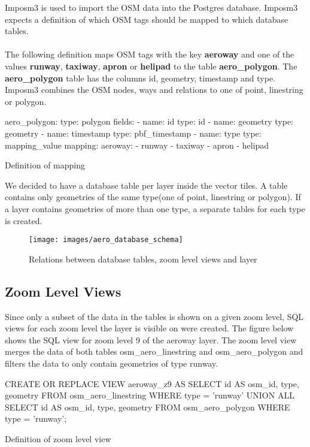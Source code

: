 Imposm3 is used to import the OSM data into the Postgres database. Imposm3 expects a definition of which OSM tags should be mapped to which database tables. \\\\
The following definition maps OSM tags with the key \textbf{aeroway} and one of the values \textbf{runway}, \textbf{taxiway}, \textbf{apron} or \textbf{helipad} to the table \textbf{aero\_polygon}. The \textbf{aero\_polygon} table has the columns id, geometry, timestamp and type. Imposm3 combines the OSM nodes, ways and relations to one of point, linestring or polygon.

\begin{listing}[H]
\begin{yamlcode}
aero_polygon:
  type: polygon
  fields:
  - name: id
    type: id
  - name: geometry
    type: geometry
  - name: timestamp
    type: pbf_timestamp
  - name: type
    type: mapping_value
  mapping:
    aeroway:
    - runway
    - taxiway
    - apron
    - helipad
\end{yamlcode}
\caption{Definition of mapping}
\label{definition_of_mapping}
\end{listing}

We decided to have a database table per layer inside the vector tiles. A table contains only geometries of the same type(one of point, linestring or polygon). If a layer contains geometries of more than one type, a separate tables for each type is created.

\begin{figure}[H]
\centering
\texttt{[image: images/aero\_database\_schema]}
\caption{Relations between database tables, zoom level views and layer}
\end{figure}

\subsection{Zoom Level Views}

Since only a subset of the data in the tables is shown on a given zoom level, SQL views for each zoom level the layer is visible on were created. The figure below shows the SQL view for zoom level 9 of the aeroway layer. The zoom level view merges the data of both tables osm\_aero\_linestring and osm\_aero\_polygon and filters the data to only contain geometries of type runway.

\begin{listing}[H]
\begin{sqlcode}
CREATE OR REPLACE VIEW aeroway_z9 AS
    SELECT id AS osm_id, type, geometry
    FROM osm_aero_linestring
    WHERE type = 'runway'
    UNION ALL
    SELECT id AS osm_id, type, geometry
    FROM osm_aero_polygon
    WHERE type = 'runway';
\end{sqlcode}
\caption{Definition of zoom level view}
\label{definition_of_zoom_level_view}
\end{listing}


